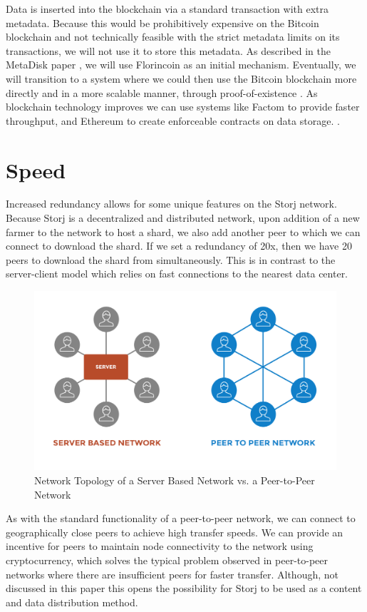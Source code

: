 \documentclass[a4paper,10pt]{article}
\begin{document}
Data is inserted into the blockchain via a standard transaction with extra metadata. Because this would be prohibitively expensive on the Bitcoin blockchain and not technically feasible with the strict metadata limits on its transactions, we will not use it to store this metadata. As described in the MetaDisk paper \cite{1}, we will use Florincoin \cite{6} as an initial mechanism. Eventually, we will transition to a system where we could then use the Bitcoin blockchain more directly and in a more scalable manner, through proof-of-existence \cite{4} \cite{5} \cite{7}. As blockchain technology improves we can use systems like Factom \cite{7} to provide faster throughput, and Ethereum \cite{22} to create enforceable contracts on data storage. . 

\section{Speed}
Increased redundancy allows for some unique features on the Storj network. Because Storj is a decentralized and distributed network, upon addition of a new farmer to the network to host a shard, we also add another peer to which we can connect to download the shard. If we set a redundancy of 20x, then we have 20 peers to download the shard from simultaneously. This is in contrast to the server-client model which relies on fast connections to the nearest data center.\\

\begin{figure}[hbt]
\centering
\includegraphics[width=\linewidth]{7}
\caption{Network Topology of a Server Based Network vs. a Peer-to-Peer Network}
\end{figure}

As with the standard functionality of a peer-to-peer network, we can connect to geographically close peers to achieve high transfer speeds. We can provide an incentive for peers to maintain node connectivity to the network using cryptocurrency, which solves the typical problem observed in peer-to-peer networks where there are insufficient peers for faster transfer. Although, not discussed in this paper this opens the possibility for Storj to be used as a content and data distribution method. 
\end{document}
